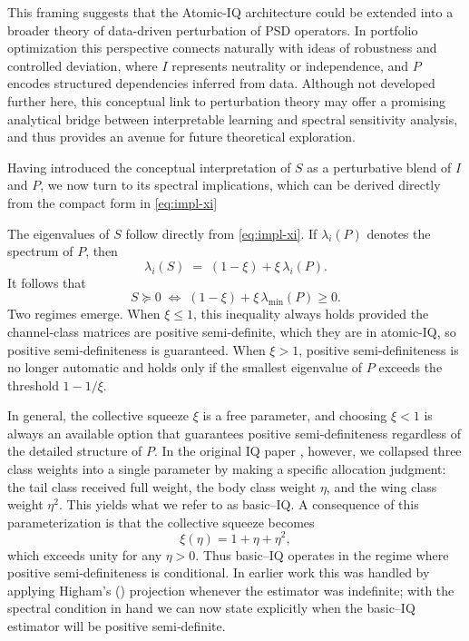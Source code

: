 \documentclass[12pt,letterpaper]{article}
\begin{document}
\medskip

This framing suggests that the Atomic-IQ architecture could be extended into a broader theory of data-driven perturbation of PSD operators. In portfolio optimization this perspective connects naturally with ideas of robustness and controlled deviation, where \(I\) represents neutrality or independence, and \(P\) encodes structured dependencies inferred from data. Although not developed further here, this conceptual link to perturbation theory may offer a promising analytical bridge between interpretable learning and spectral sensitivity analysis, and thus provides an avenue for future theoretical exploration.

Having introduced the conceptual interpretation of \(S\) as a perturbative blend of \(I\) and \(P\), we now turn to its spectral implications, which can be derived directly from the compact form in \eqref{eq:impl-xi}

The eigenvalues of \(S\) follow directly from \eqref{eq:impl-xi}. If \(\lambda_i(P)\) denotes the spectrum of \(P\), then
\[
\lambda_i(S) \;=\; (1-\xi) + \xi\,\lambda_i(P).
\]
It follows that
\[
S\succeq 0 \;\Longleftrightarrow\; (1-\xi)+\xi\,\lambda_{\min}(P)\geq 0.
\]
Two regimes emerge. When \(\xi\leq 1\), this inequality always holds provided the channel‑class matrices are positive semi‑definite, which they are in atomic-IQ, so positive semi‑definiteness is guaranteed. When \(\xi>1\), positive semi‑definiteness is no longer automatic and holds only if the smallest eigenvalue of \(P\) exceeds the threshold \(1-1/\xi\).

In general, the collective squeeze \(\xi\) is a free parameter, and choosing \(\xi<1\) is always an available option that guarantees positive semi‑definiteness regardless of the detailed structure of \(P\). In the original IQ paper \citep{gerberiqssrn}, however, we collapsed three class weights into a single parameter by making a specific allocation judgment: the tail class received full weight, the body class weight \(\eta\), and the wing class weight \(\eta^2\). This yields what we refer to as basic–IQ. A consequence of this parameterization is that the collective squeeze becomes
\[
\xi(\eta) = 1+\eta+\eta^2,
\]
which exceeds unity for any \(\eta>0\). Thus basic–IQ operates in the regime where positive semi‑definiteness is conditional. In earlier work this was handled by applying Higham’s (\cite{higham2002computing}) projection whenever the estimator was indefinite; with the spectral condition in hand we can now state explicitly when the basic–IQ estimator will be positive semi‑definite.
\end{document}
